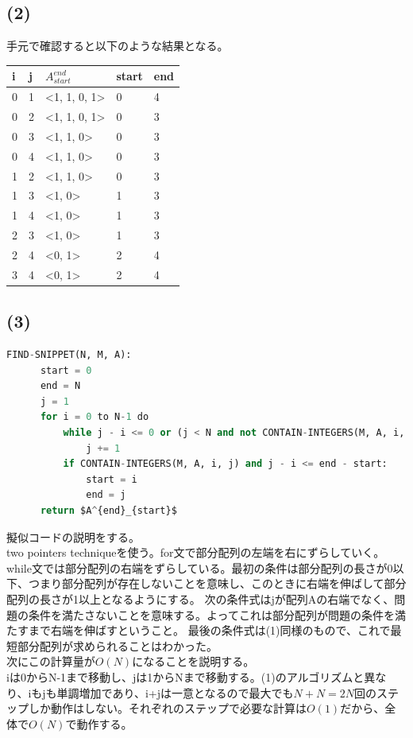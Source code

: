 \documentclass[a4paper,12pt,xelatex,ja=standard]{bxjsarticle}
\begin{document}
  \subsection*{(2)}
  手元で確認すると以下のような結果となる。
  \begin{center}
    \centering
    \begin{tabular}{|l|l|l|l|l|}
    \hline
    i & j & $A^{end}_{start}$ & start & end \\ \hline \hline
    0 & 1 & <1, 1, 0, 1>    & 0     & 4   \\ \hline
    0 & 2 & <1, 1, 0, 1>    & 0     & 3   \\ \hline
    0 & 3 & <1, 1, 0>       & 0     & 3   \\ \hline
    0 & 4 & <1, 1, 0>       & 0     & 3   \\ \hline
    1 & 2 & <1, 1, 0>       & 0     & 3   \\ \hline
    1 & 3 & <1, 0>          & 1     & 3   \\ \hline
    1 & 4 & <1, 0>          & 1     & 3   \\ \hline
    2 & 3 & <1, 0>          & 1     & 3   \\ \hline
    2 & 4 & <0, 1>          & 2     & 4   \\ \hline
    3 & 4 & <0, 1>          & 2     & 4   \\ \hline
    \end{tabular}
  \end{center}

  \subsection*{(3)}
  \begin{lstlisting}[mathescape, language=Python]
  FIND-SNIPPET(N, M, A):
      start = 0
      end = N
      j = 1
      for i = 0 to N-1 do
          while j - i <= 0 or (j < N and not CONTAIN-INTEGERS(M, A, i, j)):
              j += 1
          if CONTAIN-INTEGERS(M, A, i, j) and j - i <= end - start:
              start = i
              end = j
      return $A^{end}_{start}$
  \end{lstlisting}
  擬似コードの説明をする。\\
  two pointers techniqueを使う。for文で部分配列の左端を右にずらしていく。\\
  while文では部分配列の右端をずらしている。最初の条件は部分配列の長さが0以下、つまり部分配列が存在しないことを意味し、このときに右端を伸ばして部分配列の長さが1以上となるようにする。
  次の条件式はjが配列Aの右端でなく、問題の条件を満たさないことを意味する。よってこれは部分配列が問題の条件を満たすまで右端を伸ばすということ。
  最後の条件式は(1)同様のもので、これで最短部分配列が求められることはわかった。\\
  次にこの計算量が$O(N)$になることを説明する。\\
  iは0からN-1まで移動し、jは1からNまで移動する。(1)のアルゴリズムと異なり、iもjも単調増加であり、i+jは一意となるので最大でも$N+N=2N$回のステップしか動作はしない。それぞれのステップで必要な計算は$O(1)$だから、全体で$O(N)$で動作する。
\end{document}
